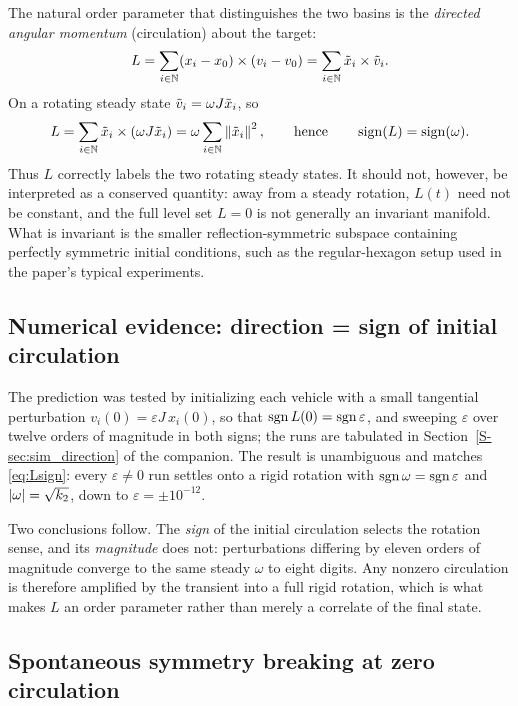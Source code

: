 The natural order parameter that distinguishes the two basins is the \emph{directed angular
momentum} (circulation) about the target:
\begin{equation}
  L=\sum_{i\in\mathbb{N}} (x_i-x_0)\times(v_i-v_0)
    =\sum_{i\in\mathbb{N}} \tilde{x}_i\times\tilde{v}_i .
  \label{eq:angmom}
\end{equation}
On a rotating steady state $\tilde{v}_i=\omega J\tilde{x}_i$, so
\begin{equation}
  L=\sum_{i\in\mathbb{N}} \tilde{x}_i\times(\omega J\tilde{x}_i)
    =\omega\sum_{i\in\mathbb{N}}\left\| \tilde{x}_i \right\|^2,
  \qquad\text{hence}\qquad
  \operatorname{sign}(L)=\operatorname{sign}(\omega).
  \label{eq:Lsign}
\end{equation}
Thus $L$ correctly labels the two rotating steady states. It should not, however, be interpreted as
a conserved quantity: away from a steady rotation, $L(t)$ need not be constant, and the full level set
$L=0$ is not generally an invariant manifold. What is invariant is the smaller reflection-symmetric
subspace containing perfectly symmetric initial conditions, such as the regular-hexagon setup used
in the paper's typical experiments.

\subsection{Numerical evidence: direction = sign of initial circulation}
\label{sec:dirn_num}

The prediction was tested by initializing each vehicle with a small tangential perturbation
$v_i(0)=\varepsilon J\,x_i(0)$, so that $\operatorname{sgn} L(0)=\operatorname{sgn}\varepsilon$, and sweeping $\varepsilon$ over
twelve orders of magnitude in both signs; the runs are tabulated in
Section~\ref{S-sec:sim_direction} of the companion. The result is unambiguous and matches
\eqref{eq:Lsign}: every $\varepsilon\ne0$ run settles onto a rigid rotation with
$\operatorname{sgn}\omega=\operatorname{sgn}\varepsilon$ and $\left| \omega \right|=\sqrt{k_2}$, down to $\varepsilon=\pm10^{-12}$.

Two conclusions follow. The \emph{sign} of the initial circulation selects the rotation sense, and its
\emph{magnitude} does not: perturbations differing by eleven orders of magnitude converge to the same
steady $\omega$ to eight digits. Any nonzero circulation is therefore amplified by the transient into
a full rigid rotation, which is what makes $L$ an order parameter rather than merely a correlate of
the final state.

\subsection{Spontaneous symmetry breaking at zero circulation}
\label{sec:ssb}

